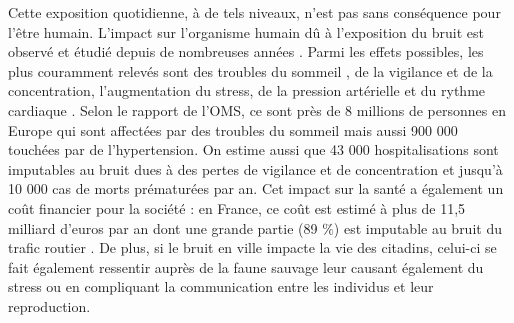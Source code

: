 Cette exposition quotidienne, à de tels niveaux, n'est pas sans conséquence pour l'être humain. L'impact sur l'organisme humain dû à l'exposition du bruit est observé et étudié depuis de nombreuses années \cite{ising1980health}. Parmi les effets possibles, les plus couramment relevés sont des troubles du sommeil \cite{pirrera2010nocturnal}, de la vigilance et de la concentration, l'augmentation du stress, de la pression artérielle et du rythme cardiaque \cite{babisch2005traffic, babisch2008road}. Selon le rapport de l'OMS, ce sont près de 8 millions de personnes en Europe qui sont affectées par des troubles du sommeil mais aussi 900 000 touchées par de l'hypertension. On estime aussi que 43 000 hospitalisations sont imputables au bruit dues à des pertes de vigilance et de concentration et jusqu'à 10 000 cas de morts prématurées par an. Cet impact sur la santé a également un coût financier pour la société : en France, ce coût est estimé à plus de 11,5 milliard d'euros par an dont une grande partie (89 $\%$) est imputable au bruit du trafic routier \cite{europeens2016analyse}. De plus, si le bruit en ville impacte la vie des citadins, celui-ci se fait également ressentir auprès de la faune sauvage \cite{dutilleux_anthropogenic_2012, francis2009noise} leur causant également du stress ou en compliquant la communication entre les individus et leur reproduction.\\

